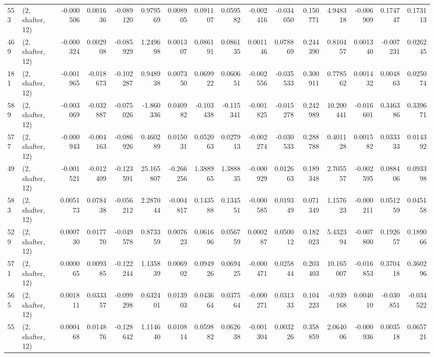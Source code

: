 \begin{tabular}{llrrrrrrrrrrrrrr}
553 &  (2, shafter, 12) &  -0.000506 &  0.001636 & -0.089120 &    0.979569 &  0.008905 &   0.091107 &  0.059582 & -0.002416 & -0.034050 &  0.150771 &    4.948318 & -0.006909 &  0.174747 &  0.173113 \\
469 &  (2, shafter, 12) &  -0.000324 &  0.002908 & -0.085929 &    1.249698 &  0.001307 &   0.086191 &  0.086135 &  0.001146 &  0.078869 &  0.244390 &    0.810457 &  0.001340 & -0.007231 &  0.026245 \\
181 &  (2, shafter, 12) &  -0.001965 & -0.018673 & -0.102287 &    0.948938 &  0.007350 &   0.069922 &  0.060651 & -0.002556 & -0.035533 &  0.300911 &    0.778562 &  0.001432 &  0.004863 &  0.025074 \\
589 &  (2, shafter, 12) &  -0.003069 & -0.032887 & -0.075026 &   -1.860336 &  0.040982 &  -0.103438 & -0.115341 & -0.001825 & -0.015278 &  0.242989 &   10.200441 & -0.016601 &  0.346386 &  0.339671 \\
577 &  (2, shafter, 12) &  -0.000943 & -0.004163 & -0.086926 &    0.460289 &  0.015031 &   0.052063 &  0.027913 & -0.002274 & -0.030533 &  0.288788 &    0.401128 &  0.001582 &  0.033333 &  0.014392 \\
49  &  (2, shafter, 12) &  -0.001521 & -0.012409 & -0.123591 &   25.165807 & -0.266256 &   1.388965 &  1.388835 & -0.000929 &  0.012663 &  0.189348 &    2.705557 & -0.002595 &  0.088406 &  0.093398 \\
583 &  (2, shafter, 12) &   0.005173 &  0.078438 & -0.056212 &    2.287044 & -0.004817 &   0.143588 &  0.134551 & -0.000585 &  0.019349 &  0.071349 &    1.157623 & -0.000211 &  0.051259 &  0.045158 \\
529 &  (2, shafter, 12) &   0.000730 &  0.017770 & -0.049578 &    0.873359 &  0.007623 &   0.061696 &  0.056759 &  0.000287 &  0.050012 &  0.182023 &    5.432394 & -0.007800 &  0.192657 &  0.189066 \\
571 &  (2, shafter, 12) &   0.000065 &  0.009385 & -0.122244 &    1.135839 &  0.006902 &   0.094926 &  0.069425 & -0.000471 &  0.025844 &  0.203403 &   10.165007 & -0.016853 &  0.370418 &  0.360296 \\
565 &  (2, shafter, 12) &   0.001811 &  0.033357 & -0.099298 &    0.632401 &  0.013903 &   0.043664 &  0.037564 & -0.000271 &  0.031333 &  0.104223 &   -0.939168 &  0.004010 & -0.030851 & -0.034522 \\
55  &  (2, shafter, 12) &   0.000468 &  0.014876 & -0.128642 &    1.114640 &  0.010814 &   0.059882 &  0.062638 & -0.001304 &  0.003226 &  0.358859 &    2.064006 & -0.000936 &  0.003518 &  0.065721 \\

\end{tabular}
